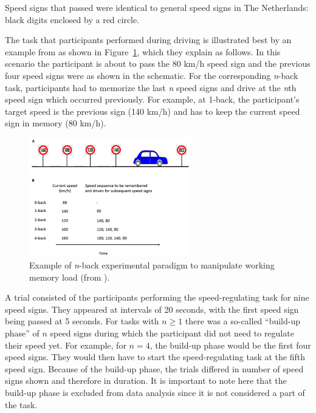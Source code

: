 Speed signs that passed were identical to general speed signs in The Netherlands: black digits enclosed by a red circle. 

The \nback task that participants performed during driving is illustrated best by an example from \citet{Unni2017} as shown in Figure~\ref{fig:nback_scheme}, which they explain as follows.
In this scenario the participant is about to pass the 80 km/h speed sign and the previous four speed signs were as shown in the schematic. 
For the corresponding \textit{n}-back task, participants had to memorize the last \textit{n} speed signs and drive at the \textit{n}th speed sign which occurred previously.
For example, at 1-back, the participant’s target speed is the previous sign (140 km/h) and has to keep the current speed sign in memory (80 km/h).

\renewcommand{\thefigure}{2.3}
\begin{figure}
  \centering
  \includegraphics[width=7cm]{images/nback_Scheunemann.pdf}
  \caption{Example of \textit{n}-back experimental paradigm to manipulate working memory load (from \citealp{Unni2017}).}
  \label{fig:nback_scheme}
\end{figure}

A trial consisted of the participants performing the speed-regulating task for nine speed signs. 
They appeared at intervals of 20 seconds, with the first speed sign being passed at 5 seconds.
For \nback tasks with \(n \geq 1\) there was a so-called ``build-up phase'' of \(n\) speed signs during which the participant did not need to regulate their speed yet. 
For example, for \(n = 4\), the build-up phase would be the first four speed signs. 
They would then have to start the speed-regulating task at the fifth speed sign.
Because of the build-up phase, the \nback trials differed in number of speed signs shown and therefore in duration.
It is important to note here that the build-up phase is excluded from data analysis since it is not considered a part of the \nback task. 

